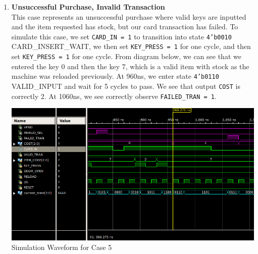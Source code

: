 \documentclass{article}
\begin{document}
\begin{enumerate}
    \item \textbf{Unsuccessful Purchase, Invalid Transaction}  \\
    This case represents an unsuccessful purchase where valid keys are inputted and the item requested has stock, but our card transaction has failed. To simulate this case, we set \texttt{CARD\_IN = 1} to transition into state \texttt{4'b0010} CARD\_INSERT\_WAIT, we then set \texttt{KEY\_PRESS = 1} for one cycle, and then set \texttt{KEY\_PRESS = 1} for one cycle. From diagram below, we can see that we entered the key 0 and then the key 7, which is a valid item with stock as the machine was reloaded previously. At 960ns, we enter state \texttt{4'b0110} VALID\_INPUT and wait for 5 cycles to pass. We see that output \texttt{COST} is correctly 2. At 1060ns, we see correctly observe \texttt{FAILED\_TRAN = 1}. 
    \begin{center}
        \includegraphics[scale=0.45]{waveform-5.png} \\
        \caption{Simulation Waveform for Case 5}
    \end{center}
    

\end{enumerate}
\end{document}
